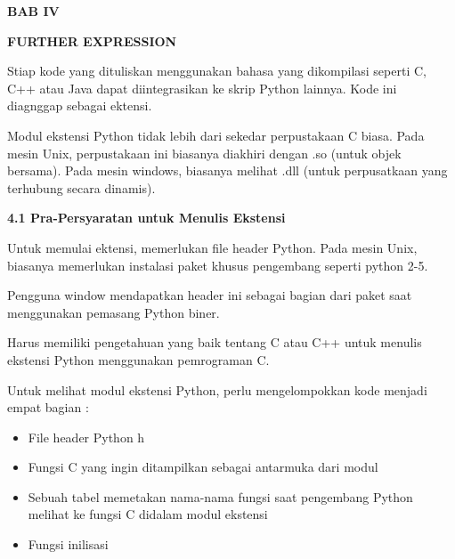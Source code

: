 \documentclass[a4paper,12pt]{report}
\begin{document}
\sloppy
\begin{center}{\fontsize{14pt}{14pt}\selectfont \textbf{BAB IV} \\}\end{center} \par
\noindent 
\begin{center}{\fontsize{14pt}{14pt}\selectfont \textbf{FURTHER EXPRESSION} \\}\end{center} \par
\vspace{14pt}
\noindent 
 \hspace*{0.5in} Stiap kode yang dituliskan menggunakan bahasa yang dikompilasi seperti C, C++ atau Java dapat diintegrasikan ke skrip Python lainnya. Kode ini diagnggap sebagai ektensi. \par
\noindent 
 \hspace*{0.5in} Modul ekstensi Python tidak lebih dari sekedar perpustakaan C biasa. Pada mesin Unix, perpustakaan ini biasanya diakhiri dengan .so (untuk objek bersama). Pada mesin windows, biasanya melihat .dll (untuk perpusatkaan yang terhubung secara dinamis).  \par
\vspace{12pt}
\noindent 
\textbf{4.1 Pra-Persyaratan untuk Menulis Ekstensi} \par
\noindent 
 \hspace*{0.5in} Untuk memulai ektensi, memerlukan file header Python. Pada mesin Unix, biasanya memerlukan instalasi paket khusus pengembang seperti python 2-5. \par
\noindent 
 \hspace*{0.5in} Pengguna window mendapatkan header ini sebagai bagian dari paket saat menggunakan pemasang Python biner. \par
\noindent 
 \hspace*{0.5in} Harus memiliki pengetahuan yang baik tentang C atau C++ untuk menulis ekstensi Python menggunakan pemrograman C. \par
\noindent 
 \hspace*{0.5in} Untuk melihat modul ekstensi Python, perlu mengelompokkan kode menjadi empat bagian : \par
\noindent 
\begin{itemize}
\item File header Python h \par
\noindent 
\item Fungsi C yang ingin ditampilkan sebagai antarmuka dari modul \par
\noindent 
\item Sebuah tabel memetakan nama-nama fungsi saat pengembang Python melihat ke fungsi C didalam modul ekstensi \par
\noindent 
\item Fungsi inilisasi\end{itemize}
\end{document}
